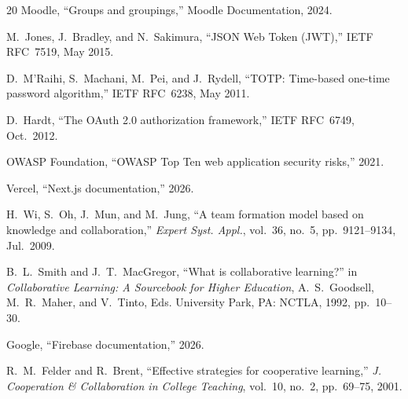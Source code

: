 \documentclass[12pt,a4paper]{article}
\begin{document}
\begin{thebibliography}{20}
Moodle, ``Groups and groupings,'' Moodle Documentation, 2024.

M.~Jones, J.~Bradley, and N.~Sakimura, ``JSON Web Token (JWT),'' IETF RFC~7519, May 2015.

D.~M'Raihi, S.~Machani, M.~Pei, and J.~Rydell, ``TOTP: Time-based one-time password algorithm,'' IETF RFC~6238, May 2011.

D.~Hardt, ``The OAuth 2.0 authorization framework,'' IETF RFC~6749, Oct.\ 2012.

OWASP Foundation, ``OWASP Top Ten web application security risks,'' 2021.

Vercel, ``Next.js documentation,'' 2026.

H.~Wi, S.~Oh, J.~Mun, and M.~Jung, ``A team formation model based on knowledge and collaboration,'' \textit{Expert Syst. Appl.}, vol.~36, no.~5, pp.~9121--9134, Jul.\ 2009.

B.~L.~Smith and J.~T.~MacGregor, ``What is collaborative learning?'' in \textit{Collaborative Learning: A Sourcebook for Higher Education}, A.~S.~Goodsell, M.~R.~Maher, and V.~Tinto, Eds.\hspace{0pt} University Park, PA: NCTLA, 1992, pp.~10--30.

Google, ``Firebase documentation,'' 2026.

R.~M.~Felder and R.~Brent, ``Effective strategies for cooperative learning,'' \textit{J. Cooperation \& Collaboration in College Teaching}, vol.~10, no.~2, pp.~69--75, 2001.

\end{thebibliography}
\end{document}
